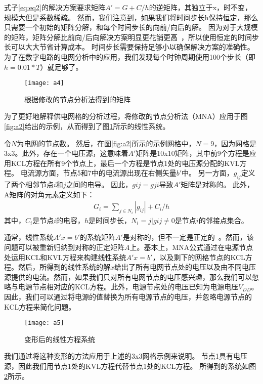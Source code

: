 式子\ref{eq:eq2}的解决方案要求矩阵$A'= G + C / h$的逆矩阵，其独立于x，时不变，规模大但是系数稀疏。 然而，我们注意到，如果我们将时间步长h保持恒定，那么只需要一个初始的矩阵分解，和每个时间步长的向前/向后的解。 因为对于大规模的矩阵，矩阵分解比前向/后向解决方案明显更花销更高~\cite{golub2012matrix}，所以使用恒定的时间步长可以大大节省计算成本。 时间步长需要保持足够小以确保解决方案的准确性。 为了在数字电路的电网分析中的应用，我们发现每个时钟周期使用100个步长（即$h = 0.01 * T$）就足够了。

\begin{figure}[H] %
  \centering
  \texttt{[image: a4]}
  \caption{根据修改的节点分析法得到的矩阵}
  \label{fig:a4}
\end{figure}

为了更好地解释供电网格的分析过程，将修改的节点分析法（MNA）应用于图\ref{fig:a2}给出的示例，从而得到了图\ref{fig:a4}所示的线性系统。

令$N$为电网的节点数。 然后，在图\ref{fig:a2}所示的示例网格中，$N = 9$，因为网格是3x3。此外，存在一个电压源，这意味着$A'$矩阵是10x10矩阵，其中前9个方程是应用KCL方程在所有9个节点上，最后一个方程是节点1处的电压源分配的KVL方程。 电流源方面，节点5和7中的电流源出现在右侧矢量$b'$中。 另一方面，$g_{ij}$定义了两个相邻节点$i$和$j$之间的电导。 因此，$g{ij} = g{ji}$导致$A'$矩阵是对称的。 此外，A矩阵的对角元素定义如下：
\begin{align}
    G_i = \sum_{j\in N_i} |g_{ij}| + C_i/h
\end{align}
其中，$C_i$是节点$i$的电容，$h$是时间步长，$N_i={j|g{ij}\neq 0}$是节点$i$的邻接点集合。

通常，线性系统$A'x = b'$的系统矩阵$A'$是对称的，但不一定是正定的~\cite{9}。然而，该问题可以被重新归纳到对称的正定矩阵$A$上。基本上，MNA公式通过在电源节点处运用KCL和KVL方程来构建线性系统$A'x = b'$，以及剩下的网格节点的KCL方程。然后，所得到的线性系统的解$x$给出了所有电网节点处的电压以及由不同电压源提供的电流。然而，如果我们只对所有电网节点的电压感兴趣，那么我们可以忽略与电源节点相对应的KCL方程。此外，电源节点处的电压已知为电源电压$V_{DD}$。因此，我们可以通过将电源的值替换为所有电源节点的电压，并忽略电源节点的KCL方程来简化问题。

\begin{figure}[H] %
  \centering
  \texttt{[image: a5]}
  \caption{变形后的线性方程系统}
  \label{fig:a5}
\end{figure}

我们通过将这种变形的方法应用于上述的3x3网格示例来说明。 节点1具有电压源，因此我们用节点1处的KVL方程代替节点1处的KCL方程。 所得到的系统如图\ref{fig:a5}所示。

